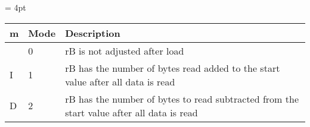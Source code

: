 {
\tabulinesep = 4pt
\begin{tabu} to \linewidth { X[-2c]  X[-1c]  X[l] }
m & Mode & Description \\
\hline
 & 0 & rB is not adjusted after load \\
I & 1 & rB has the number of bytes read added to the start value after all data is read \\
D & 2 & rB has the number of bytes to read subtracted from the start value after all data is read \\
\end{tabu}
}
